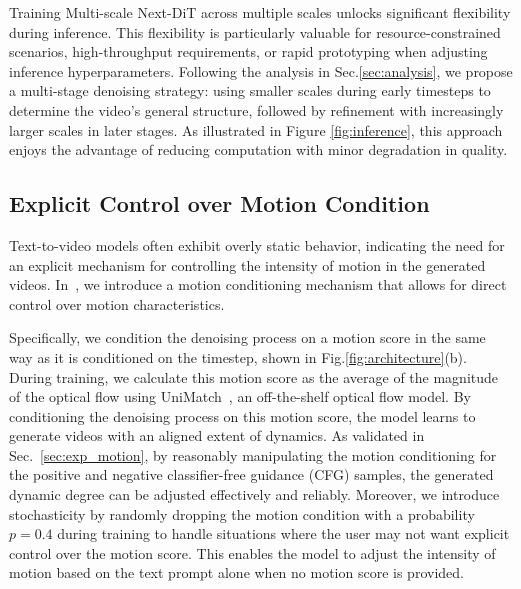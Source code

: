 Training Multi-scale Next-DiT across multiple scales unlocks significant flexibility during inference. This flexibility is particularly valuable for resource-constrained scenarios, high-throughput requirements, or rapid prototyping when adjusting inference hyperparameters. Following the analysis in Sec.\ref{sec:analysis}, we propose a multi-stage denoising strategy: using smaller scales during early timesteps to determine the video’s general structure, followed by refinement with increasingly larger scales in later stages. As illustrated in Figure \ref{fig:inference}, this approach enjoys the advantage of reducing computation with minor degradation in quality.



\subsection{Explicit Control over Motion Condition}

Text-to-video models often exhibit overly static behavior, indicating the need for an explicit mechanism for controlling the intensity of motion in the generated videos. In~\sysname{}, we introduce a motion conditioning mechanism that allows for direct control over motion characteristics.

Specifically, we condition the denoising process on a motion score in the same way as it is conditioned on the timestep, shown in Fig.\ref{fig:architecture}(b). 
During training, we calculate this motion score as the average of the magnitude of the optical flow using UniMatch~\citep{unimatch}, an off-the-shelf optical flow model. By conditioning the denoising process on this motion score, the model learns to generate videos with an aligned extent of dynamics. As validated in Sec.~\ref{sec:exp_motion}, by reasonably manipulating the motion conditioning for the positive and negative classifier-free guidance (CFG) samples, the generated dynamic degree can be adjusted effectively and reliably. Moreover, we introduce stochasticity by randomly dropping the motion condition with a probability $p=0.4$ during training to handle situations where the user may not want explicit control over the motion score. This enables the model to adjust the intensity of motion based on the text prompt alone when no motion score is provided.
